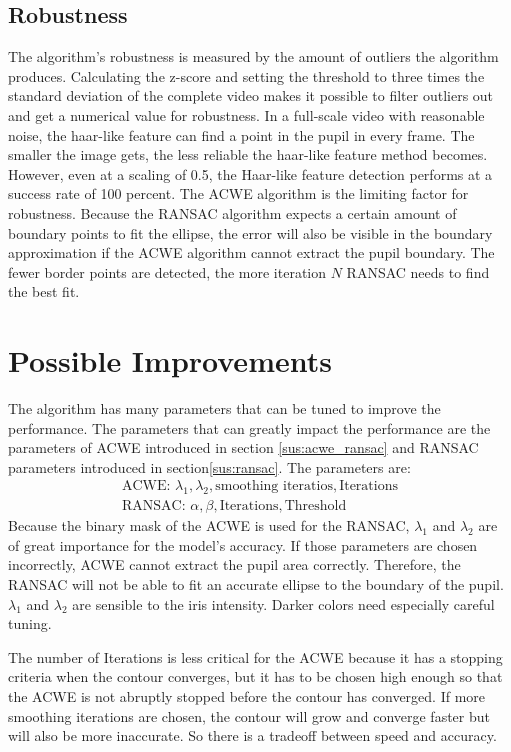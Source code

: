 \subsection{Robustness}
The algorithm's robustness is measured by the amount of outliers the algorithm produces. Calculating the z-score and setting the threshold to three times the standard deviation of the complete video makes it possible to filter outliers out and get a numerical value for robustness. In a full-scale video with reasonable noise, the haar-like feature can find a point in the pupil in every frame. The smaller the image gets, the less reliable the haar-like feature method becomes. However, even at a scaling of 0.5, the Haar-like feature detection performs at a success rate of 100 percent. The ACWE algorithm is the limiting factor for robustness. Because the RANSAC algorithm expects a certain amount of boundary points to fit the ellipse, the error will also be visible in the boundary approximation if the ACWE algorithm cannot extract the pupil boundary. The fewer border points are detected, the more iteration $N$ RANSAC needs to find the best fit. 

\section{Possible Improvements}
The algorithm has many parameters that can be tuned to improve the performance. The parameters that can greatly impact the performance are the parameters of ACWE introduced in section \ref{sus:acwe_ransac} and RANSAC parameters introduced in section\ref{sus:ransac}. The parameters are:
\begin{gather*}
    \text{ACWE: } \lambda_1, \lambda_2,\text{smoothing iteratios}, \text{Iterations}\\
    \text{RANSAC: } \alpha, \beta, \text{Iterations}, \text{Threshold}
\end{gather*}
Because the binary mask of the ACWE is used for the RANSAC, $\lambda_1$ and $\lambda_2$ are of great importance for the model's accuracy. If those parameters are chosen incorrectly, ACWE cannot extract the pupil area correctly. Therefore, the RANSAC will not be able to fit an accurate ellipse to the boundary of the pupil. $\lambda_1$ and $\lambda_2$ are sensible to the iris intensity. Darker colors need especially careful tuning. 

The number of Iterations is less critical for the ACWE because it has a stopping criteria when the contour converges, but it has to be chosen high enough so that the ACWE is not abruptly stopped before the contour has converged. If more smoothing iterations are chosen, the contour will grow and converge faster but will also be more inaccurate. So there is a tradeoff between speed and accuracy. 

